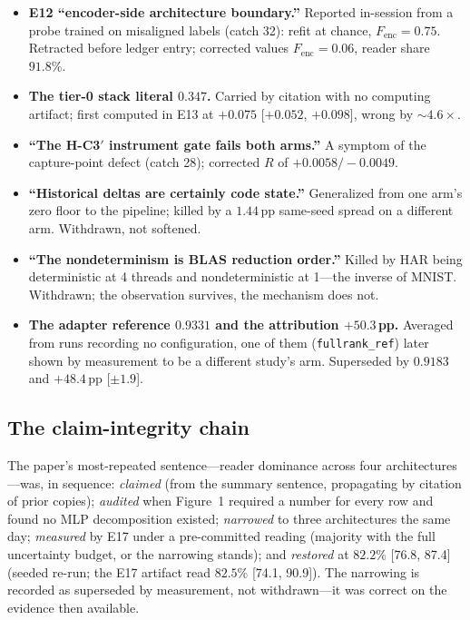 \begin{itemize}\setlength\itemsep{2pt}
\item \textbf{E12 ``encoder-side architecture boundary.''} Reported in-session
  from a probe trained on misaligned labels (catch 32): refit at chance,
  $F_{\mathrm{enc}} = 0.75$. Retracted before ledger entry; corrected values
  $F_{\mathrm{enc}} = 0.06$, reader share $91.8\%$.
\item \textbf{The tier-0 stack literal $0.347$.} Carried by citation with no
  computing artifact; first computed in E13 at $+0.075$ [$+0.052$, $+0.098$],
  wrong by $\sim 4.6\times$.
\item \textbf{``The H-C3$'$ instrument gate fails both arms.''} A symptom of the
  capture-point defect (catch 28); corrected $R$ of $+0.0058 / -0.0049$.
\item \textbf{``Historical deltas are certainly code state.''} Generalized from
  one arm's zero floor to the pipeline; killed by a $1.44$\,pp same-seed spread
  on a different arm. Withdrawn, not softened.
\item \textbf{``The nondeterminism is BLAS reduction order.''} Killed by HAR
  being deterministic at 4 threads and nondeterministic at 1---the inverse of
  MNIST. Withdrawn; the observation survives, the mechanism does not.
\item \textbf{The adapter reference $0.9331$ and the attribution $+50.3$\,pp.}
  Averaged from runs recording no configuration, one of them
  (\texttt{fullrank\_ref}) later shown by measurement to be a different
  study's arm. Superseded by $0.9183$ and $+48.4$\,pp [$\pm 1.9$].
\end{itemize}

\subsection{The claim-integrity chain}

The paper's most-repeated sentence---reader dominance across four
architectures---was, in sequence: \emph{claimed} (from the summary sentence,
propagating by citation of prior copies); \emph{audited} when Figure~1 required
a number for every row and found no MLP decomposition existed; \emph{narrowed}
to three architectures the same day; \emph{measured} by E17 under a
pre-committed reading (majority with the full uncertainty budget, or the
narrowing stands); and \emph{restored} at $82.2\%$ [76.8, 87.4] (seeded re-run;
the E17 artifact read $82.5\%$ [74.1, 90.9]). The narrowing
is recorded as superseded by measurement, not withdrawn---it was correct on the
evidence then available.

